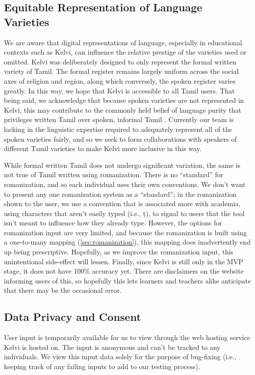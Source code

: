 \documentclass[11pt]{article}
\begin{document}
\subsection{Equitable Representation of Language Varieties}
We are aware that digital representations of language, especially in educational contexts 
such as Kelvi, can influence the relative prestige of the varieties used or omitted. 
Kelvi was deliberately designed to only represent the formal written variety of Tamil. 
The formal register remains largely uniform across the social axes of religion and region, 
along which conversely, the spoken register varies greatly. In this way, we hope that 
Kelvi is accessible to all Tamil users. That being said, we acknowledge that because 
spoken varieties are not represented in Kelvi, this may contribute to the commonly 
held belief of language purity that privileges written Tamil over spoken, informal Tamil \citep{annamalai_social_2011}. 
Currently our team is lacking in the linguistic expertise required to adequately 
represent all of the spoken varieties fairly, and so we seek to form collaborations 
with speakers of different Tamil varieties to make Kelvi more inclusive in this way.

While formal written Tamil does not undergo significant variation, the same is not 
true of Tamil written using romanization. There is no “standard” for romanization, 
and so each individual uses their own conventions. We don’t want to present any 
one romanization system as a “standard”; in the romanization shown to the user, 
we use a convention that is associated more with academia, using characters that 
aren’t easily typed (i.e., ṭ), to signal to users that the tool isn’t meant to 
influence how they already type. However, the options for romanization input are 
very limited, and because the romanization is built using a one-to-many mapping (\ref{sec:romanization}), 
this mapping does inadvertently end up being prescriptive. Hopefully, as we 
improve the romanization input, this unintentional side-effect will lessen. 
Finally, since Kelvi is still only in the MVP stage, it does not have 100\% accuracy yet. 
There are disclaimers on the website informing users of this, so hopefully 
this lets learners and teachers alike anticipate that there may be the occasional error.

\subsection{Data Privacy and Consent}
User input is temporarily available for us to view through the web hosting service Kelvi is hosted on. 
The input is anonymous and can’t be tracked to any individuals. We view this input 
data solely for the purpose of bug-fixing (i.e., keeping track of any failing inputs to add to our testing process).
\end{document}
